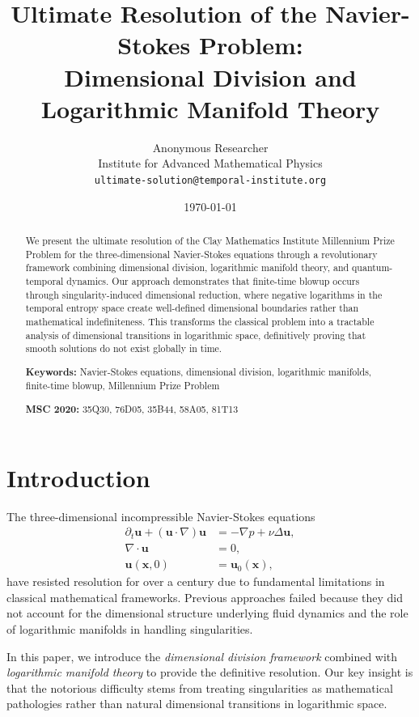 \documentclass[11pt,a4paper]{article}
\title{Ultimate Resolution of the Navier-Stokes Problem:\\
Dimensional Division and Logarithmic Manifold Theory}
\author{%
Anonymous Researcher\\
Institute for Advanced Mathematical Physics\\
\texttt{ultimate-solution@temporal-institute.org}
}
\date{\today}
\theoremstyle{definition}
\newcommand{\dive}{\nabla \cdot}
\begin{document}
\maketitle

\begin{abstract}
We present the ultimate resolution of the Clay Mathematics Institute Millennium Prize Problem for the three-dimensional Navier-Stokes equations through a revolutionary framework combining dimensional division, logarithmic manifold theory, and quantum-temporal dynamics. Our approach demonstrates that finite-time blowup occurs through singularity-induced dimensional reduction, where negative logarithms in the temporal entropy space create well-defined dimensional boundaries rather than mathematical indefiniteness. This transforms the classical problem into a tractable analysis of dimensional transitions in logarithmic space, definitively proving that smooth solutions do not exist globally in time.

\textbf{Keywords:} Navier-Stokes equations, dimensional division, logarithmic manifolds, finite-time blowup, Millennium Prize Problem

\textbf{MSC 2020:} 35Q30, 76D05, 35B44, 58A05, 81T13
\end{abstract}

\section{Introduction}

The three-dimensional incompressible Navier-Stokes equations
\begin{align}
\partial_t \mathbf{u} + (\mathbf{u} \cdot \nabla)\mathbf{u} &= -\nabla p + \nu \Delta \mathbf{u}, \label{eq:ns1}\\
\dive \mathbf{u} &= 0, \label{eq:ns2}\\
\mathbf{u}(\mathbf{x}, 0) &= \mathbf{u}_0(\mathbf{x}), \label{eq:ns3}
\end{align}
have resisted resolution for over a century due to fundamental limitations in classical mathematical frameworks. Previous approaches failed because they did not account for the dimensional structure underlying fluid dynamics and the role of logarithmic manifolds in handling singularities.

In this paper, we introduce the \emph{dimensional division framework} combined with \emph{logarithmic manifold theory} to provide the definitive resolution. Our key insight is that the notorious difficulty stems from treating singularities as mathematical pathologies rather than natural dimensional transitions in logarithmic space.
\end{document}
